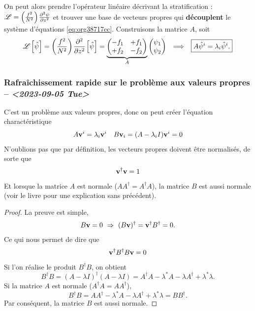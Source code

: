 \documentclass[10pt]{report}
\numberwithin{equation}{section}
\newcommand{\vv}{\vb{v}}
\newcommand{\pt}{\hspace{1pt}} %
\begin{document}
On peut alors prendre l'opérateur linéaire décrivant la stratification : \(\mathscr{L} = \qty(\frac{f^2}{N^2})\pt\pdv[2]{\psi}{z}\) et trouver une base de vecteurs propres qui \textbf{découplent} le système d'équations \ref{eq:org38717cc}.
Construisons la matrice \(A\), soit
\begin{align}
\label{eq:orgfc735fa}
&& \mathscr{L} \pt\qty[ \hat{\psi} ] = \qty(\frac{f^2}{N^2})\pt\pdv[2]{}{z} \pt\qty[\hat{\psi}]= 
   \underbrace{
   \begin{pmatrix}
     -f_1 & +f_1 \\
     +f_2 & -f_2 \\
   \end{pmatrix}}_{A}
   \begin{pmatrix}
     \psi_1 \\
     \psi_2 \\
   \end{pmatrix}
   && \Longrightarrow
   && \boxed{ A \hat{\psi}^i = \lambda_i \hat{\psi}^i. } &&
\end{align}

\subsubsection{Rafraîchissement rapide sur le problème aux valeurs propres -- \textit{<2023-09-05 Tue>}}
\label{sec:orgbcaf9d4}

C'est un problème aux valeurs propres, donc on peut créer l'équation charactéristique
\begin{align}
\label{eq:org97a60a5}
   && A \vv^i = \lambda_i \vv^i && B \vv_i = (A - \lambda_i I)\vv^i = 0 &&
\end{align}
N'oublions pas que par définition, les vecteurs propres doivent être normalisés, de sorte que
\begin{equation}
   \vv^\dagger \vv = 1
\end{equation}
Et lorsque la matrice \(A\) est normale (\(AA^\dagger = A^\dagger A\)), la matrice \(B\) est aussi normale (voir le livre \textcite[p.274 pour un résumé sans précédent]{riley_hobson_bence_2006} pour une explication sans précédent).
\begin{proof}
La preuve est simple, 
\begin{equation}
   B\vv = 0 \ \Rightarrow\ (B\vv)^\dagger = \vv^\dagger B^\dagger = 0. 
\end{equation}
Ce qui nous permet de dire que
\begin{equation}
   \vv^\dagger B^\dagger B \vv = 0
\end{equation}
Si l'on réalise le produit $B^\dagger B$, on obtient
\begin{equation}
   B^\dagger B = (A-\lambda I)^\dagger (A-\lambda I) = A^\dagger A - \lambda^* A -\lambda A^\dagger + \lambda^*\lambda.
\end{equation}
Si la matrice $A$ est normale ($A^\dagger A = A A^\dagger$),
\begin{equation}
   B^\dagger B = A A^\dagger - \lambda^* A -\lambda A^\dagger + \lambda^*\lambda = BB^\dagger.
\end{equation}
Par conséquent, la matrice $B$ est aussi normale.
\end{proof}
\end{document}
